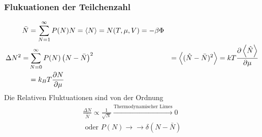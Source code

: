 \documentclass[11pt]{article}
\theoremstyle{plain}
\theoremstyle{mytheoremstyle}
\newcommand{\pd}[2]{\frac{\partial #1 }{\partial #2}}
\begin{document}
\subsubsection*{Flukuationen der Teilchenzahl}
%
\begin{align*}
  \bar{N} &  = \sum_{N = 1}^{ \infty} P(N) N  = \Braket{N} = 
  N(T, \mu, V) = -\beta \Phi \\
  \Delta N^2 = &  \sum_{N=0}^{ \infty} P(N) \left( N- \bar{N} \right)^2 
  & =  \Braket{(\hat{N} - \bar{N})^2} = k T \pd{\Braket{\hat{N}}}{\mu} \\ &  = 
  k_B T \pd{N}{\mu}
\end{align*}
%
Die Relativen Fluktuationen sind von der Ordnung 
%
\begin{align*}
  \frac{\Delta{}N}{\bar{N}} \propto \frac{1}{\sqrt{N}} 
  \xrightarrow{\text{Thermodynamischer Limes}} 0  \\
  \text{ oder } P(N) \xrightarrow{ } \to \delta(N - \bar{N})
\end{align*}
%
\end{document}
